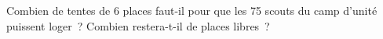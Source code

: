 %
%
Combien de tentes de 6 places faut-il pour que les 75 scouts du camp d'unité puissent loger~? Combien restera-t-il de places libres~?
